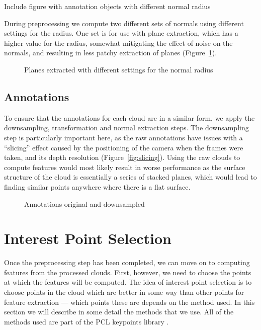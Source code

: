 \documentclass[11pt,a4paper]{kth-mag}
\begin{document}
Include figure with annotation objects with different normal radius

During preprocessing we compute two different sets of normals using different
settings for the radius. One set is for use with plane extraction, which has a
higher value for the radius, somewhat mitigating the effect of noise on the
normals, and resulting in less patchy extraction of planes
(Figure~\ref{fig:plane_normrad}).

\begin{figure}
  \centering
  
  \caption{Planes extracted with different settings for the normal radius}
  \label{fig:plane_normrad}
\end{figure}

\subsection{Annotations}
To ensure that the annotations for each cloud are in a similar form, we apply
the downsampling, transformation and normal extraction steps. The downsampling
step is particularly important here, as the raw annotations have issues with a
``slicing'' effect caused by the positioning of the camera when the frames were
taken, and its depth resolution (Figure~\ref{fig:slicing}). Using the raw clouds
to compute features would most likely result in worse performance as the surface
structure of the cloud is essentially a series of stacked planes, which would
lead to finding similar points anywhere where there is a flat surface.

\begin{figure}
  \centering
  \caption{Annotations original and downsampled}
  \label{fig:annotation_ds}
\end{figure}
\section{Interest Point Selection}
Once the preprocessing step has been completed, we can move on to computing
features from the processed clouds. First, however, we need to choose the points
at which the features will be computed. The idea of interest point selection is
to choose points in the cloud which are better in some way than other points for
feature extraction --- which points these are depends on the method used. In
this section we will describe in some detail the methods that we use. All of the
methods used are part of the PCL keypoints library \cite{pcl_keypoints}.
\end{document}
